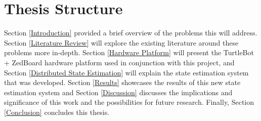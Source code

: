 \documentclass[thesis.tex]{subfile}
\begin{document}
\section{Thesis Structure} \label{Thesis Structure}
Section \ref{Introduction} provided a brief overview of the problems this will address. Section \ref{Literature Review} will explore the existing literature around these problems more in-depth. Section \ref{Hardware Platform} will present the TurtleBot + ZedBoard hardware platform used in conjunction with this project, and Section \ref{Distributed State Estimation} will explain the state estimation system that was developed. Section \ref{Results} showcases the results of this new state estimation system and Section \ref{Discussion} discusses the implications and significance of this work and the possibilities for future research. Finally, Section \ref{Conclusion} concludes this thesis.
\end{document}
